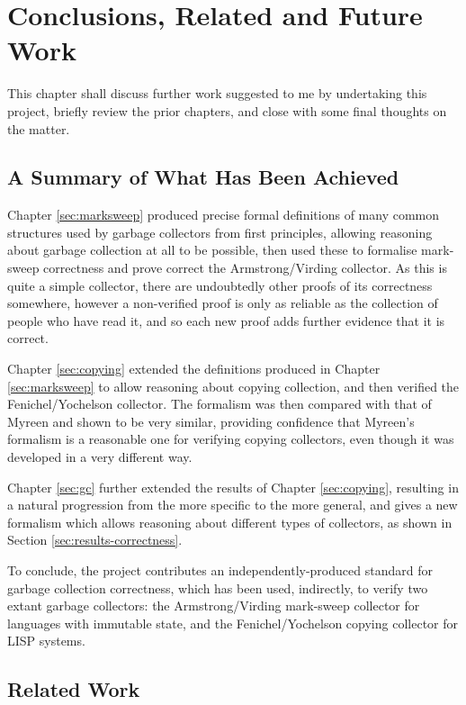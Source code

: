 \chapter{Conclusions, Related and Future Work}
\label{sec:conclusion}

This chapter shall discuss further work suggested to me by undertaking
this project, briefly review the prior chapters, and close with some
final thoughts on the matter.

\section{A Summary of What Has Been Achieved}
\label{sec:conclusion-review}

Chapter \ref{sec:marksweep} produced precise formal definitions of
many common structures used by garbage collectors from first
principles, allowing reasoning about garbage collection at all to be
possible, then used these to formalise mark-sweep correctness and
prove correct the Armstrong/Virding collector. As this is quite a
simple collector, there are undoubtedly other proofs of its
correctness somewhere, however a non-verified proof is only as
reliable as the collection of people who have read it, and so each new
proof adds further evidence that it is correct.

Chapter \ref{sec:copying} extended the definitions produced in Chapter
\ref{sec:marksweep} to allow reasoning about copying collection, and
then verified the Fenichel/Yochelson collector. The formalism was then
compared with that of Myreen\cite{Myreen10} and shown to be very
similar, providing confidence that Myreen's formalism is a reasonable
one for verifying copying collectors, even though it was developed in
a very different way.

Chapter \ref{sec:gc} further extended the results of Chapter
\ref{sec:copying}, resulting in a natural progression from the more
specific to the more general, and gives a new formalism which allows
reasoning about different types of collectors, as shown in Section
\ref{sec:results-correctness}.

To conclude, the project contributes an independently-produced
standard for garbage collection correctness, which has been used,
indirectly, to verify two extant garbage collectors: the
Armstrong/Virding mark-sweep collector for languages with immutable
state, and the Fenichel/Yochelson copying collector for LISP systems.

\section{Related Work}
\label{sec:conclusion-related}

